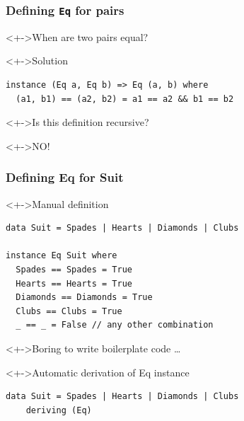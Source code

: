 \documentclass{beamer}
\begin{document}
\begin{frame}[fragile]
  \frametitle{Defining \texttt{Eq} for pairs}
  \begin{block}<+->{When are two pairs equal?}
  \end{block}
  \begin{block}<+->{Solution}
\begin{lstlisting}
instance (Eq a, Eq b) => Eq (a, b) where
  (a1, b1) == (a2, b2) = a1 == a2 && b1 == b2
\end{lstlisting}
  \end{block}
  \begin{block}<+->{Is this definition recursive?}
  \end{block}
  \begin{alertblock}<+->{NO!}
  \end{alertblock}
\end{frame}
\begin{frame}[fragile]
  \frametitle{Defining Eq for Suit}
  \begin{block}<+->{Manual definition}
\begin{lstlisting}
data Suit = Spades | Hearts | Diamonds | Clubs

instance Eq Suit where
  Spades == Spades = True
  Hearts == Hearts = True
  Diamonds == Diamonds = True
  Clubs == Clubs = True
  _ == _ = False // any other combination
\end{lstlisting}
  \end{block}
  \begin{alertblock}<+->{Boring to write boilerplate code \dots}
    
  \end{alertblock}
  \begin{block}<+->{Automatic derivation of Eq instance}
\begin{lstlisting}
data Suit = Spades | Hearts | Diamonds | Clubs
    deriving (Eq)
\end{lstlisting}
  \end{block}
\end{frame}
\end{document}
